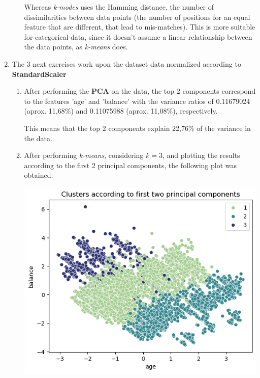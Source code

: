 \documentclass[12pt]{article}
\begin{document}
\begin{enumerate}[leftmargin=0pt, label=\textbf{\arabic*.)},start=1]
\begin{enumerate}[leftmargin=0pt, label=\textbf{\alph*.)}]
                    Whereas \textit{k-modes} uses the Hamming distance, the number of dissimilarities between data points (the number of positions for an equal feature that are different, that lead to mis-matches). This is more suitable for categorical data, since it doesn't assume a linear relationship between the data points, as \textit{k-means} does.

          \end{enumerate}
    \item The 3 next exercises work upon the dataset data normalized according to \textbf{StandardScaler}
          \begin{enumerate}[leftmargin=0pt, label=\textbf{\alph*.)}]
              \item After performing the \textbf{PCA} on the data, the top 2 components correspond to the features 'age' and 'balance' with the variance ratios of 0.11679024 (aprox. 11,68\%) and 0.11075988 (aprox. 11,08\%), respectively.

                    This means that the top 2 components explain 22,76\% of the variance in the data.

              \item After performing \textit{k-means}, considering $k=3$, and plotting the results according to the first 2 principal components, the following plot was obtained:

                    \begin{center}
                        \includegraphics{clusters_first_two_components.png}
                    \end{center}


\end{enumerate}
\end{enumerate}
\end{document}
